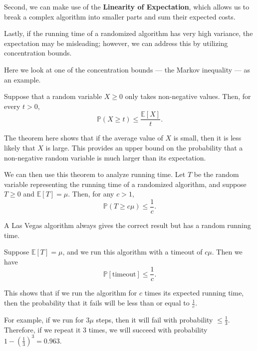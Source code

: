 Second, we can make use of the \textbf{Linearity of Expectation}, which allows us to break a complex algorithm into smaller parts and sum their expected costs. 

Lastly, if the running time of a randomized algorithm has very high variance, the expectation may be misleading; however, we can address this by utilizing concentration bounds. 

Here we look at one of the concentration bounds — the Markov inequality — as an example.

\begin{theorem}
  Suppose that a random variable \(X \geq 0\) only takes non-negative values. Then, for every \(t > 0\),
  \[
      \mathbb{P}(X \geq t) \leq \dfrac{\mathbb{E}[X]}{t}.
  \]
\end{theorem}

The theorem here shows that if the average value of \(X\) is small, then it is less likely that \(X\) is large. This provides an upper bound on the probability that a non-negative random variable is much larger than its expectation. 

We can then use this theorem to analyze running time. Let \(T\) be the random variable representing the running time of a randomized algorithm, and suppose \(T \geq 0\) and \(\mathbb{E}[T] = \mu\). Then, for any \(c > 1\),
\[
    \mathbb{P}(T \geq c \mu) \leq \dfrac{1}{c}.
\]

\begin{eg}
  A Las Vegas algorithm always gives the correct result but has a random running time.

  Suppose \(\mathbb{E}[T] = \mu\), and we run this algorithm with a timeout of \(c \mu\). Then we have 
  \[
    \mathbb{P}[\text{timeout}] \leq \dfrac{1}{c}.
  \]

  This shows that if we run the algorithm for \(c\) times its expected running time, then the probability that it fails will be less than or equal to \(\frac{1}{c}\). 

  For example, if we run for \(3\mu\) steps, then it will fail with probability \(\leq \frac{1}{3}\). Therefore, if we repeat it 3 times, we will succeed with probability \(1 - \left(\frac{1}{3}\right)^3 = 0.963\).
\end{eg}